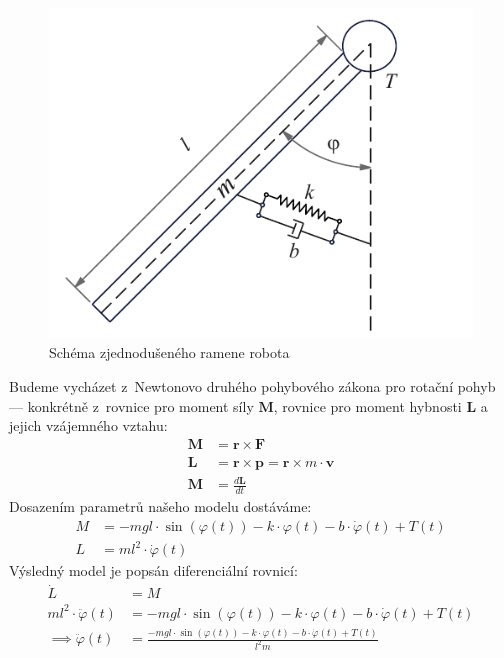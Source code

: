 \begin{figure}[H]
    \centering
    \includegraphics{Img/Drawing.pdf}
    \caption{Schéma zjednodušeného ramene robota}
    \label{fig:1 DoF schéma robota}
\end{figure}
Budeme vycházet z~Newtonovo druhého pohybového zákona pro rotační pohyb --- konkrétně z~rovnice pro moment síly $\bm{M}$, rovnice pro moment hybnosti $\bm{L}$
a jejich vzájemného vztahu:
\begin{align}
    \bm{M} & = \bm{r}\times\bm{F}                             \\
    \bm{L} & = \bm{r}\times\bm{p} = \bm{r}\times m\cdot\bm{v} \\
    \bm{M} & = \frac{d\bm{L}}{dt}
\end{align}
Dosazením parametrů našeho modelu dostáváme:
\begin{align}
    M & = -mgl\cdot\sin(\varphi(t)) -k\cdot\varphi(t) - b \cdot\dot{\varphi}(t) + T(t) \\
    L & =  ml^2\cdot\dot\varphi(t)
\end{align}
Výsledný model je popsán diferenciální rovnicí:
\begin{align}
    \dot{L}                    & =  M                                                                                        \\
    ml^2\cdot\ddot\varphi(t)   & = -mgl\cdot\sin(\varphi(t)) -k\cdot\varphi(t) - b \cdot\dot{\varphi}(t) + T(t)              \\
    \implies \ddot{\varphi}(t) & =  \frac{- mgl\cdot\sin(\varphi(t)) - k\cdot\varphi(t) -b\cdot\dot\varphi(t) + T(t)}{l^2m }
\end{align}
